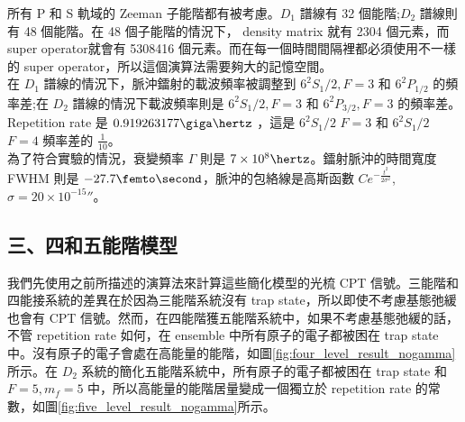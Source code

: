 \documentclass[11pt,a4paper]{article}
\begin{document}
所有 P 和 S 軌域的 Zeeman 子能階都有被考慮。$D_1$ 譜線有 32 個能階;$D_2$ 譜線則有 48 個能階。在 48 個子能階的情況下， density matrix 就有 2304 個元素，而 super operator就會有 5308416 個元素。而在每一個時間間隔裡都必須使用不一樣的 super operator，所以這個演算法需要夠大的記憶空間。\\

在 $D_1$ 譜線的情況下，脈沖鐳射的載波頻率被調整到 $6^2S_1/2, F=3$ 和 $6^2P_{1/2}$ 的頻率差;在 $D_2$ 譜線的情況下載波頻率則是 $6^2S_1/2 , F=3$ 和 $6^2P_{3/2} , F=3$ 的頻率差。Repetition rate 是 $0.919263177 \giga\hertz$ ，這是 $6^2S_1/2$ $F=3$ 和 $6^2S_1/2$ $F=4$ 頻率差的 $\frac{1}{10}$。\\

為了符合實驗的情況，衰變頻率 $\Gamma$ 則是 $7 \times 10^8 \hertz$。鐳射脈沖的時間寬度 FWHM 則是 $-27.7\femto\second$，脈沖的包絡線是高斯函數 $C e^{ - \frac{t^2}{2 \sigma^{2}} }$, $\sigma = 20 \times 10^{-15} \second$。\\


\subsection{三、四和五能階模型}

我們先使用之前所描述的演算法來計算這些簡化模型的光梳 CPT 信號。三能階和四能接系統的差異在於因為三能階系統沒有 trap state，所以即使不考慮基態弛緩也會有 CPT 信號。然而，在四能階獲五能階系統中，如果不考慮基態弛緩的話，不管 repetition rate 如何，在 ensemble 中所有原子的電子都被困在 trap state 中。沒有原子的電子會處在高能量的能階，如圖\ref{fig:four_level_result_nogamma}所示。在 $D_2$ 系統的簡化五能階系統中，所有原子的電子都被困在 trap state 和 $F=5, m_f=5$ 中，所以高能量的能階居量變成一個獨立於 repetition rate 的常數，如圖\ref{fig:five_level_result_nogamma}所示。\\
\end{document}
